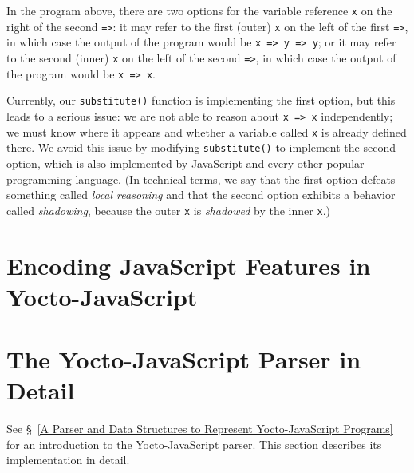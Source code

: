 \documentclass[12pt, oneside]{book}
\begin{document}
In the program above, there are two options for the variable reference \texttt{x} on the right of the second \texttt{=>}: it may refer to the first (outer) \texttt{x} on the left of the first \texttt{=>}, in which case the output of the program would be \texttt{x => y => y}; or it may refer to the second (inner) \texttt{x} on the left of the second \texttt{=>}, in which case the output of the program would be \texttt{x => x}.

Currently, our \texttt{substitute()} function is implementing the first option, but this leads to a serious issue: we are not able to reason about \texttt{x => x} independently; we must know where it appears and whether a variable called \texttt{x} is already defined there. We avoid this issue by modifying \texttt{substitute()} to implement the second option, which is also implemented by JavaScript and every other popular programming language. (In technical terms, we say that the first option defeats something called \emph{local reasoning} and that the second option exhibits a behavior called \emph{shadowing}, because the outer \texttt{x} is \emph{shadowed} by the inner \texttt{x}.)


\appendix

\chapter{Encoding JavaScript Features in Yocto-JavaScript}
\label{Encoding JavaScript Features in Yocto-JavaScript}


\chapter{The Yocto-JavaScript Parser in Detail}
\label{The Yocto-JavaScript Parser in Detail}

See §~\ref{A Parser and Data Structures to Represent Yocto-JavaScript Programs} for an introduction to the Yocto-JavaScript parser. This section describes its implementation in detail.
\end{document}
